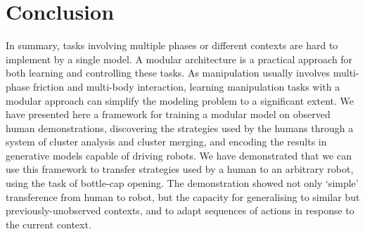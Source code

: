 
\section{Conclusion}
\label{conc.sec}
In summary, tasks involving multiple phases or different contexts are
hard to implement by a single model. A modular architecture is a
practical approach for both learning and controlling these tasks. As
manipulation usually involves multi-phase friction and multi-body
interaction, learning manipulation tasks with a modular approach can
simplify the modeling problem to a significant extent.  We have
presented here a framework for training a modular model on observed
human demonstrations, discovering the strategies used by the humans
through a system of cluster analysis and cluster merging, and encoding
the results in generative models capable of driving robots.  We have
demonstrated that we can use this framework to transfer strategies
used by a human to an arbitrary robot, using the task of bottle-cap
opening.  The demonstration showed not only `simple' transference from
human to robot, but the capacity for generalising to similar but
previously-unobserved contexts, and to adapt sequences of actions in
response to the current context.




